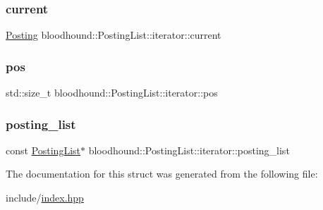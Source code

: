 \subsubsection{\texorpdfstring{current}{current}}
{\footnotesize\ttfamily \hyperlink{structbloodhound_1_1Posting}{Posting} bloodhound\+::\+Posting\+List\+::iterator\+::current}

\mbox{\label{structbloodhound_1_1PostingList_1_1iterator_a544fdd6020d2ec35d883250dd79115e8}} 
\subsubsection{\texorpdfstring{pos}{pos}}
{\footnotesize\ttfamily std\+::size\+\_\+t bloodhound\+::\+Posting\+List\+::iterator\+::pos}

\mbox{\label{structbloodhound_1_1PostingList_1_1iterator_a3a9afedb85f883831ee68fee0611ca92}} 
\subsubsection{\texorpdfstring{posting\+\_\+list}{posting\_list}}
{\footnotesize\ttfamily const \hyperlink{classbloodhound_1_1PostingList}{Posting\+List}$\ast$ bloodhound\+::\+Posting\+List\+::iterator\+::posting\+\_\+list}



The documentation for this struct was generated from the following file\+:\begin{DoxyCompactItemize}
\item 
include/\hyperlink{index_8hpp}{index.\+hpp}\end{DoxyCompactItemize}
